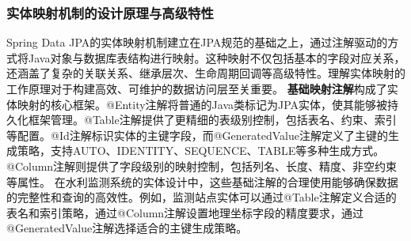 \subsubsection{实体映射机制的设计原理与高级特性}\label{ux5b9eux4f53ux6620ux5c04ux673aux5236ux7684ux8bbeux8ba1ux539fux7406ux4e0eux9ad8ux7ea7ux7279ux6027}
Spring Data
JPA的实体映射机制建立在JPA规范的基础之上，通过注解驱动的方式将Java对象与数据库表结构进行映射。这种映射不仅包括基本的字段对应关系，还涵盖了复杂的关联关系、继承层次、生命周期回调等高级特性。理解实体映射的工作原理对于构建高效、可维护的数据访问层至关重要。
\textbf{基础映射注解}构成了实体映射的核心框架。@Entity注解将普通的Java类标记为JPA实体，使其能够被持久化框架管理。@Table注解提供了更精细的表级别控制，包括表名、约束、索引等配置。@Id注解标识实体的主键字段，而@GeneratedValue注解定义了主键的生成策略，支持AUTO、IDENTITY、SEQUENCE、TABLE等多种生成方式。@Column注解则提供了字段级别的映射控制，包括列名、长度、精度、非空约束等属性。
在水利监测系统的实体设计中，这些基础注解的合理使用能够确保数据的完整性和查询的高效性。例如，监测站点实体可以通过@Table注解定义合适的表名和索引策略，通过@Column注解设置地理坐标字段的精度要求，通过@GeneratedValue注解选择适合的主键生成策略。
